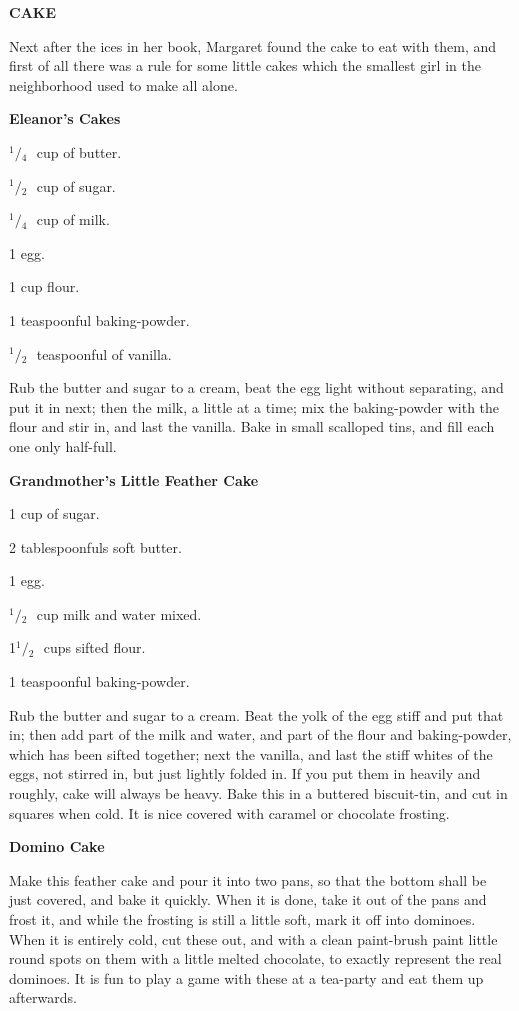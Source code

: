 \documentclass[11pt]{book}
\newcommand{\indpar}{\par\noindent\hspace*{\parindent}}
\newcommand{\ingredient}{\indpar}
\newcommand{\instruction}{\indpar}
\newcommand{\OneHalf}{\ensuremath{{}^1\!\!/\!{}_2\mbox{\ }}}
\newcommand{\OneQuarter}{\ensuremath{{}^1\!\!/\!{}_4\mbox{\ }}}
\newenvironment{RecipeTitle}{\medskip\begin{center}\large\bf }{\end{center}\smallskip}
\newenvironment{FoodTypeTitle}{\begin{center}\large\bf }{\end{center}}
\begin{document}
\begin{FoodTypeTitle}
CAKE\label{CAKE}
\end{FoodTypeTitle}
\indpar 
  Next after the ices in her book, Margaret found the cake to
eat with them, and first of all there was a rule for some
little cakes which the smallest girl in the neighborhood used
to make all alone.
\begin{RecipeTitle}
Eleanor's Cakes\label{eleanors_cakes}
\end{RecipeTitle}
\ingredient  \OneQuarter cup of butter.
\ingredient  \OneHalf cup of sugar.
\ingredient  \OneQuarter cup of milk.
\ingredient  1 egg.
\ingredient  1 cup flour.
\ingredient  1 teaspoonful baking-powder.
\ingredient  \OneHalf teaspoonful of vanilla.
\instruction  Rub the butter and sugar to a cream, beat the egg light
without separating, and put it in next; then the milk, a
little at a time; mix the baking-powder with the flour and
stir in, and last the vanilla.  Bake in small scalloped tins,
and fill each one only half-full.
\begin{RecipeTitle}
Grandmother's Little Feather Cake\label{grandmothers_little_feather_cake}
\end{RecipeTitle}
\ingredient  1 cup of sugar.
\ingredient  2 tablespoonfuls soft butter.
\ingredient  1 egg.
\ingredient  \OneHalf cup milk and water mixed.
\ingredient  1\OneHalf cups sifted flour.
\ingredient  1 teaspoonful baking-powder.
\instruction  Rub the butter and sugar to a cream.  Beat the yolk of the
egg stiff and put that in; then add part of the milk and water,
and part of the flour and baking-powder, which has been sifted
together; next the vanilla, and last the stiff whites of the
eggs, not stirred in, but just lightly folded in.  If you put
them in heavily and roughly, cake will always be heavy.  Bake
this in a buttered biscuit-tin, and cut in squares when cold.
It is nice covered with caramel or chocolate frosting.
\begin{RecipeTitle}
Domino Cake\label{domino_cake}
\end{RecipeTitle}
\instruction  Make this feather cake and pour it into two pans, so that
the bottom shall be just covered, and bake it quickly.  When
it is done, take it out of the pans and frost it, and while
the frosting is still a little soft, mark it off into
dominoes.  When it is entirely cold, cut these out, and with a
clean paint-brush paint little round spots on them with a
little melted chocolate, to exactly represent the real
dominoes.  It is fun to play a game with these at a tea-party
and eat them up afterwards.
\end{document}
